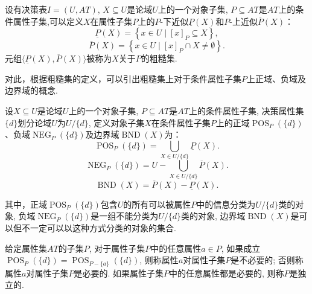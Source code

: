 \begin{Definition}[粗糙集]\cite{2009New}
设有决策表$I=(U,AT)$, $X\subseteq U$是论域$U$上的一个对象子集, $P \subseteq AT$是$AT$上的条件属性子集,可以定义$X$在属性子集$P$上的$P$-下近似$\underline{P}(X)$和$P$-上近似$\overline{P}(X)$：
$$\underline{P}(X)=\left\{x \in U \mid[x]_{P} \subseteq X\right\},$$
$$\overline{P}(X)=\left\{x \in U \mid[x]_{P} \cap X \neq \emptyset \right\}.$$
元组$\langle\underline{P}(X), \overline{P} (X)\rangle$被称为$X$关于$P$的粗糙集.
\end{Definition}

对此，根据粗糙集的定义，可以引出粗糙集上对于条件属性子集$P$上正域、负域及边界域的概念.
\begin{Definition}[正域、负域、边界域]\cite{2009New}
设$X\subseteq U$是论域$U$上的一个对象子集, $P \subseteq AT$是$AT$上的条件属性子集, 决策属性集$\{d\}$划分论域$U$为$U/\{d\}$, 定义对象子集$X$在条件属性子集$P$上的正域$\operatorname{POS}_{P}(\{d\})$、负域$\operatorname{NEG}_{P}(\{d\})$及边界域$\operatorname{BND}(X)$为：
$$\operatorname{POS}_{P}(\{d\})=\bigcup_{X \in U / \{d\}} \underline{P} (X).$$
$$\operatorname{NEG}_{P}(\{d\})=U-\bigcup_{X \in U / \{d\}} \overline{P} (X).$$
$$\operatorname{BND}(X)=\overline{P}(X)-\underline{P} (X).$$
\end{Definition}
其中，正域$\operatorname{POS}_{P}(\{d\})$包含$U$的所有可以被属性$P$中的信息分类为$U/\{d\}$类的对象, 负域$\operatorname{NEG}_{P}(\{d\})$是一组不能分类为$U/\{d\}$类的对象, 边界域$\operatorname{BND}(X)$是可以但不一定可以以这种方式分类的对象的集合.
\begin{Definition}[属性的必要性]\cite{翟俊海2014}
    给定属性集$AT$的子集$P$, 对于属性子集$P$中的任意属性$a \in P$, 如果成立$\operatorname{POS}_{P}(\{d\})  =  \operatorname{POS}_{P-\{a\}}(\{d\})$, 则称属性$a$对属性子集$P$是不必要的; 否则称属性$a$对属性子集$P$是必要的. 如果属性子集$P$中的任意属性都是必要的, 则称$P$是独立的. 
\end{Definition}
